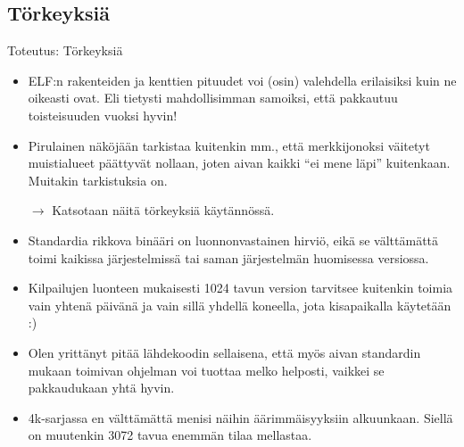 \documentclass[pdf,10pt]{beamer}
\begin{document}
\subsection{Törkeyksiä}
\begin{frame}{Toteutus: Törkeyksiä}
  \begin{itemize}
    \item ELF:n rakenteiden ja kenttien pituudet voi (osin) valehdella
      erilaisiksi kuin ne oikeasti ovat. Eli tietysti mahdollisimman
      samoiksi, että pakkautuu toisteisuuden vuoksi hyvin!
    \item Pirulainen näköjään tarkistaa kuitenkin mm., että
      merkkijonoksi väitetyt muistialueet päättyvät nollaan, joten
      aivan kaikki ``ei mene läpi'' kuitenkaan. Muitakin tarkistuksia
      on.
    \item[$\rightarrow$] Katsotaan näitä törkeyksiä käytännössä.
    \item Standardia rikkova binääri on luonnonvastainen hirviö, eikä
      se välttämättä toimi kaikissa järjestelmissä tai saman
      järjestelmän huomisessa versiossa.
    \item Kilpailujen luonteen mukaisesti 1024 tavun version tarvitsee
      kuitenkin toimia vain yhtenä päivänä ja vain sillä yhdellä
      koneella, jota kisapaikalla käytetään :)
    \item Olen yrittänyt pitää lähdekoodin sellaisena, että myös aivan
      standardin mukaan toimivan ohjelman voi tuottaa melko helposti,
      vaikkei se pakkaudukaan yhtä hyvin.
    \item 4k-sarjassa en välttämättä menisi näihin äärimmäisyyksiin
      alkuunkaan. Siellä on muutenkin 3072 tavua enemmän tilaa
      mellastaa.
  \end{itemize}
\end{frame}
\end{document}
